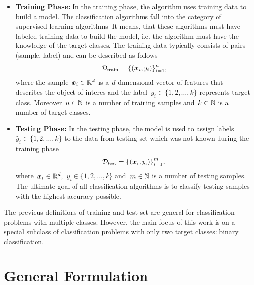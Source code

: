 \begin{itemize}
  \item \textbf{Training Phase:} In the training phase, the algorithm uses training data to build a model. The classification algorithms fall into the category of supervised learning algorithms. It means, that these algorithms must have labeled training data to build the model, i.e. the algorithm must have the knowledge of the target classes. The training data typically consists of pairs (sample, label) and can be described as follows
  \begin{equation*}\label{eq: training set}
    \mathcal{D}_{\mathrm{train}} = \Brac[c]{(\bm{x}_i, y_i)}_{i=1}^{n},
  \end{equation*}
  where the sample~$\bm{x}_i \in \mathbb{R}^d$ is a~$d$-dimensional vector of features that describes the object of interes and the label~$y_i \in \{1, 2, \ldots, k\}$ represents target class. Moreover~$n \in \mathbb{N}$ is a number of training samples and~$k \in \mathbb{N}$ is a number of target classes.
  \item \textbf{Testing Phase:} In the testing phase, the model is used to assign labels~$\hat{y}_i \in \{1, 2, \ldots, k\}$ to the data from testing set which was not known during the training phase
  \begin{equation*}\label{eq: test set}
    \mathcal{D}_{\mathrm{test}} = \Brac[c]{(\bm{x}_i, y_i)}_{i=1}^{m},
  \end{equation*}
  where~$\bm{x}_i \in \mathbb{R}^d,$~$y_i \in \{1, 2, \ldots, k\}$ and~$m \in \mathbb{N}$ is a number of testing samples. The ultimate goal of all classification algorithms is to classify testing samples with the highest accuracy possible.
\end{itemize}
The previous definitions of training and test set are general for classification problems with multiple classes. However, the main focus of this work is on a special subclass of classification problems with only two target classes: binary classification.


\section{General Formulation}\label{sec: general formulation}


